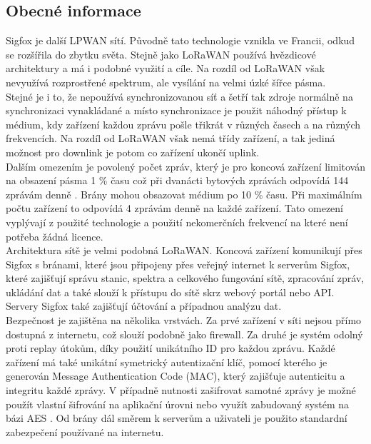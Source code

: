 \documentclass{ctuthesis}
\begin{document}
\subsection{Obecné informace}
Sigfox je další LPWAN sítí. Původně tato technologie vznikla ve Francii, odkud se rozšířila do zbytku světa. Stejně jako LoRaWAN používá hvězdicové architektury a má i podobné využití a cíle. Na rozdíl od LoRaWAN však nevyužívá rozprostřené spektrum, ale vysílání na velmi úzké šířce pásma.\\
Stejné je i to, že nepoužívá synchronizovanou síť a šetří tak zdroje normálně na synchronizaci vynakládané a místo synchronizace je použit náhodný přístup k médium, kdy zařízení každou zprávu pošle třikrát v různých časech a na různých frekvencích. Na rozdíl od LoRaWAN však nemá třídy zařízení, a tak jediná možnost pro downlink je potom co zařízení ukončí uplink.\\
Dalším omezením je povolený počet zpráv, který je pro koncová zařízení limitován na obsazení pásma 1 \% času což při dvanácti bytových zprávách odpovídá 144 zprávám denně \cite{sigfox2017}. Brány mohou obsazovat médium po 10 \% času. Při maximálním počtu zařízení to odpovídá 4 zprávám denně na každé zařízení. Tato omezení vyplývají z použité technologie a použití nekomerčních frekvencí na které není potřeba žádná licence.\\
Architektura sítě je velmi podobná LoRaWAN. Koncová zařízení komunikují přes Sigfox s bránami, které jsou připojeny přes veřejný internet k serverům Sigfox, které zajišťují správu stanic, spektra a celkového fungování sítě, zpracování zpráv, ukládání dat a také slouží k přístupu do sítě skrz webový portál nebo API. Servery Sigfox také zajišťují účtování a případnou analýzu dat.\\
Bezpečnost je zajištěna na několika vrstvách. Za prvé zařízení v síti nejsou přímo dostupná z internetu, což slouží podobně jako firewall. Za druhé je systém odolný proti replay útokům, díky použití unikátního ID pro každou zprávu. Každé zařízení má také unikátní symetrický autentizační klíč, pomocí kterého je generován Message Authentication Code (MAC), který zajišťuje autenticitu a integritu každé zprávy. V případně nutnosti zašifrovat samotné zprávy je možné použít vlastní šifrování na aplikační úrovni nebo využít zabudovaný systém na bázi AES \cite{sigsec}. Od brány dál směrem k serverům a uživateli je použito standardní zabezpečení používané na internetu.
\end{document}
